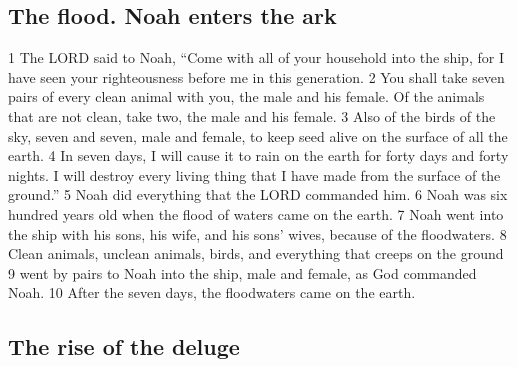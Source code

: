 \hypertarget{the-flood.-noah-enters-the-ark}{%
\subsection{The flood. Noah enters the
ark}\label{the-flood.-noah-enters-the-ark}}

{1} The LORD said to Noah, ``Come with all of your household into the
ship, for I have seen your righteousness before me in this generation.
{2} You shall take seven pairs of every clean animal with you, the male
and his female. Of the animals that are not clean, take two, the male
and his female. {3} Also of the birds of the sky, seven and seven, male
and female, to keep seed alive on the surface of all the earth. {4} In
seven days, I will cause it to rain on the earth for forty days and
forty nights. I will destroy every living thing that I have made from
the surface of the ground.'' {5} Noah did everything that the LORD
commanded him. {6} Noah was six hundred years old when the flood of
waters came on the earth. {7} Noah went into the ship with his sons, his
wife, and his sons' wives, because of the floodwaters. {8} Clean
animals, unclean animals, birds, and everything that creeps on the
ground {9} went by pairs to Noah into the ship, male and female, as God
commanded Noah. {10} After the seven days, the floodwaters came on the
earth.

\hypertarget{the-rise-of-the-deluge}{%
\subsection{The rise of the deluge}\label{the-rise-of-the-deluge}}

